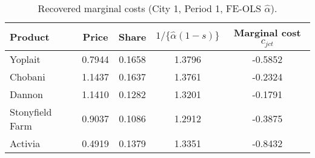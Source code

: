 \begin{table}[H]
\centering
\caption{Recovered marginal costs (City 1, Period 1, FE-OLS $\hat\alpha$).}
\label{tab:q11_mc_c1t1_fe}
\begin{tabular}{lcccc}
\toprule
Product & Price & Share & $1/\{\hat\alpha(1-s)\}$ & Marginal cost $c_{jct}$ \\
\midrule
Yoplait & 0.7944 & 0.1658 & 1.3796 & -0.5852 \\
Chobani & 1.1437 & 0.1637 & 1.3761 & -0.2324 \\
Dannon & 1.1410 & 0.1282 & 1.3201 & -0.1791 \\
Stonyfield Farm & 0.9037 & 0.1086 & 1.2912 & -0.3875 \\
Activia & 0.4919 & 0.1379 & 1.3351 & -0.8432 \\
\bottomrule
\end{tabular}
\end{table}
